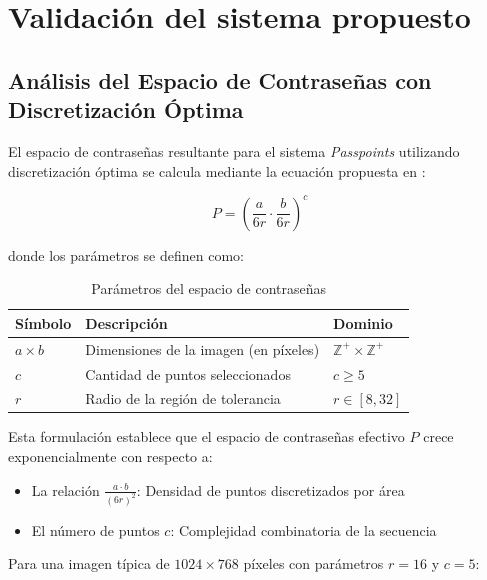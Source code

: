 \chapter{Validaci\'on del sistema propuesto}\label{chapter:validation}


\section{Análisis del Espacio de Contraseñas con Discretización Óptima}
\label{subsec:espacio-contrasenas}

El espacio de contraseñas resultante para el sistema \textit{Passpoints} utilizando discretización óptima se calcula mediante la ecuación propuesta en \cite{birget2006graphical}:

\begin{equation}
	P = \left( \frac{a}{6r} \cdot \frac{b}{6r} \right)^c
	\label{eq:espacio-contrasenas}
\end{equation}

donde los parámetros se definen como:

\begin{table}[ht]
	\centering
	\caption{Parámetros del espacio de contraseñas}
	\label{tab:parametros-espacio}
	\begin{tabularx}{0.9\textwidth}{lXl}
		\toprule
		\textbf{Símbolo} & \textbf{Descripción} & \textbf{Dominio} \\
		\midrule
		$a \times b$ & Dimensiones de la imagen (en píxeles) & $\mathbb{Z}^+ \times \mathbb{Z}^+$ \\
		$c$ & Cantidad de puntos seleccionados & $c \geq 5$ \\
		$r$ & Radio de la región de tolerancia & $r \in [8, 32]$ \\
		\bottomrule
	\end{tabularx}
\end{table}

\vspace{0.5cm}

Esta formulación establece que el espacio de contraseñas efectivo $P$ crece exponencialmente con respecto a:
\begin{itemize}
	\item La relación $\frac{a \cdot b}{(6r)^2}$: Densidad de puntos discretizados por área
	\item El número de puntos $c$: Complejidad combinatoria de la secuencia
\end{itemize}

Para una imagen típica de $1024 \times 768$ píxeles con parámetros $r = 16$ y $c = 5$:


